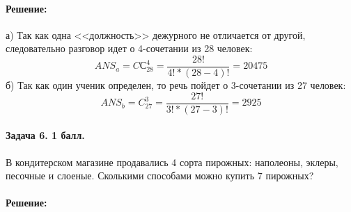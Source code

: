 \documentclass[12pt]{article}
\begin{document}
\paragraph{\bf Решение:}
а) Так как одна <<должность>> дежурного не отличается от другой, следовательно
разговор идет о 4-сочетании из 28 человек:
$$ ANS_a = CС_{28}^{4} = \frac{28!}{4! * (28 - 4)!} = 20475 $$
б) Так как один ученик определен, то речь пойдет о 3-сочетании из 27 человек:
$$ ANS_b = C_{27}^{3} = \frac{27!}{3! * (27 - 3)!} = 2925 $$

\paragraph{Задача 6. 1 балл.} В кондитерском магазине продавались 4 сорта 
пирожных: наполеоны, эклеры, песочные и слоеные. Сколькими способами 
можно купить 7 пирожных? 

\paragraph{\bf Решение:}
\end{document}
